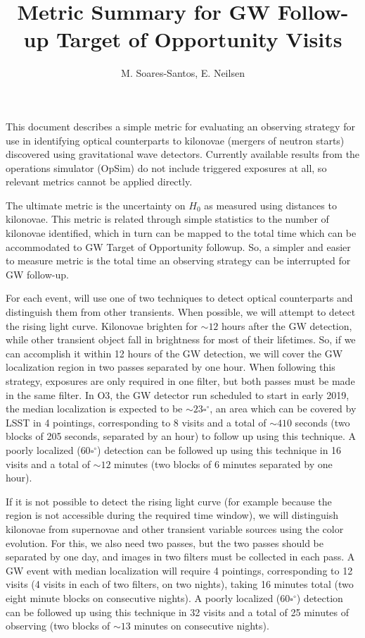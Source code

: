 \documentclass[a4paper,10pt]{article}
\title{Metric Summary for GW Follow-up Target of Opportunity Visits}
\author{M. Soares-Santos, E. Neilsen}
\date{}
\newcommand{\degree}{\ensuremath{^{\circ}}}
\begin{document}
\maketitle
This document describes a simple metric for evaluating an observing strategy for use in identifying optical counterparts to kilonovae (mergers of neutron starts) discovered using gravitational wave detectors. Currently available results from the operations simulator (OpSim) do not include triggered exposures at all, so relevant metrics cannot be applied directly.

The ultimate metric is the uncertainty on $H_0$ as measured using distances to kilonovae. This metric is related through simple statistics to the number of kilonovae identified, which in turn can be mapped to the total time which can be accommodated to GW Target of Opportunity followup. So, a simpler and easier to measure metric is the total time an observing strategy can be interrupted for GW follow-up.

For each event, will use one of two techniques to detect optical counterparts and distinguish them from other transients. When possible, we will attempt to detect the rising light curve. Kilonovae brighten for $\sim12$ hours after the GW detection, while other transient object fall in brightness for most of their lifetimes. So, if we can accomplish it within 12 hours of the GW detection, we will cover the GW localization region in two passes separated by one hour. When following this strategy, exposures are only required in one filter, but both passes must be made in the same filter. In O3, the GW detector run scheduled to start in early 2019, the median localization is expected to be $\sim 23 \square\degree$, an area which can be covered by LSST in 4 pointings, corresponding to 8 visits and a total of $\sim 410$ seconds (two blocks of 205 seconds, separated by an hour) to follow up using this technique. A poorly localized ($60 \square \degree$) detection can be followed up using this technique in 16 visits and a total of $\sim 12$ minutes (two blocks of 6 minutes separated by one hour).

If it is not possible to detect the rising light curve (for example because the region is not accessible during the required time window), we will distinguish kilonovae from supernovae and other transient variable sources using the color evolution. For this, we also need two passes, but the two passes should be separated by one day, and images in two filters must be collected in each pass. A GW event with median localization will require 4 pointings, corresponding to 12 visits (4 visits in each of two filters, on two nights), taking 16 minutes total (two eight minute blocks on consecutive nights). A poorly localized ($60 \square \degree$) detection can be followed up using this technique in 32 visits and a total of 25 minutes of observing (two blocks of $\sim 13$ minutes on consecutive nights).
\end{document}
